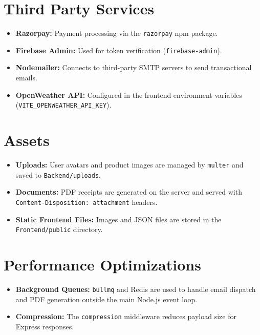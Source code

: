\documentclass[11pt,a4paper]{article}
\begin{document}
\section{Third Party Services}
\begin{itemize}[leftmargin=*]
    \item \textbf{Razorpay:} Payment processing via the \texttt{razorpay} npm package.
    \item \textbf{Firebase Admin:} Used for token verification (\texttt{firebase-admin}).
    \item \textbf{Nodemailer:} Connects to third-party SMTP servers to send
          transactional emails.
    \item \textbf{OpenWeather API:} Configured in the frontend environment
          variables (\texttt{VITE\_OPENWEATHER\_API\_KEY}).
\end{itemize}

\section{Assets}
\begin{itemize}[leftmargin=*]
    \item \textbf{Uploads:} User avatars and product images are managed by
          \texttt{multer} and saved to \texttt{Backend/uploads}.
    \item \textbf{Documents:} PDF receipts are generated on the server and
          served with \texttt{Content-Disposition: attachment} headers.
    \item \textbf{Static Frontend Files:} Images and JSON files are stored in
          the \texttt{Frontend/public} directory.
\end{itemize}

\section{Performance Optimizations}
\begin{itemize}[leftmargin=*]
    \item \textbf{Background Queues:} \texttt{bullmq} and Redis are used to
          handle email dispatch and PDF generation outside the main Node.js
          event loop.
    \item \textbf{Compression:} The \texttt{compression} middleware reduces
          payload size for Express responses.
\end{itemize}
\end{document}
